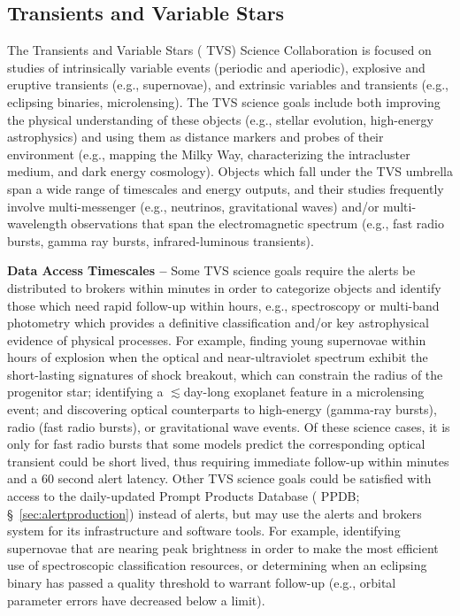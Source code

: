 \subsection{Transients and Variable Stars}\label{ssec:sci_tvs}

The Transients and Variable Stars ( {TVS})  {Science Collaboration} is focused on studies of intrinsically variable events (periodic and aperiodic), explosive and eruptive transients (e.g., supernovae), and extrinsic variables and transients (e.g., eclipsing binaries, microlensing).
The  {TVS} science goals include both improving the physical understanding of these objects (e.g., stellar evolution, high-energy astrophysics) and using them as distance markers and probes of their environment (e.g., mapping the Milky Way, characterizing the intracluster medium, and dark energy cosmology).
Objects which fall under the  {TVS} umbrella span a wide range of timescales and energy outputs, and their studies frequently involve multi-messenger (e.g., neutrinos, gravitational waves) and/or multi-wavelength observations that span the electromagnetic spectrum (e.g., fast radio bursts, gamma ray bursts, infrared-luminous transients). 

{\bf Data Access Timescales --}
Some  {TVS} science goals require the alerts be distributed to brokers within minutes in order to categorize objects and identify those which need rapid follow-up within hours, e.g., spectroscopy or multi-band photometry which provides a definitive classification and/or key astrophysical evidence of physical processes.
For example, finding young supernovae within hours of explosion when the optical and near-ultraviolet spectrum exhibit the short-lasting signatures of shock breakout, which can constrain the radius of the progenitor star; identifying a $\lesssim$day-long exoplanet feature in a microlensing event; and discovering optical counterparts to high-energy (gamma-ray bursts), radio (fast radio bursts), or gravitational wave events.
Of these science cases, it is only for fast radio bursts that some models predict the corresponding optical  {transient} could be short lived, thus requiring immediate follow-up within minutes and a $60$ second alert latency.
Other  {TVS} science goals could be satisfied with access to the daily-updated Prompt Products Database ( {PPDB}; \S~\ref{sec:alertproduction}) instead of alerts, but may use the alerts and brokers system for its infrastructure and software tools.
For example, identifying supernovae that are nearing peak brightness in order to make the most efficient use of spectroscopic classification resources, or determining when an eclipsing binary has passed a quality threshold to warrant follow-up (e.g., orbital parameter errors have decreased below a limit).

